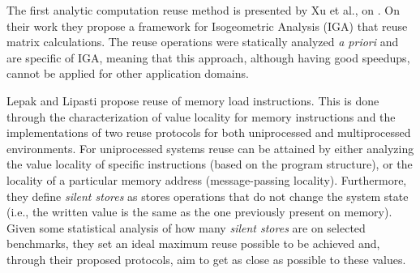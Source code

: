The first analytic computation reuse method is presented by Xu et al., on \cite{reuse12}. On their work they propose a framework for Isogeometric Analysis (IGA) that reuse matrix calculations. The reuse operations were statically analyzed \textit{a priori} and are specific of IGA, meaning that this approach, although having good speedups, cannot be applied for other application domains.

Lepak and Lipasti \cite{reuse14} propose reuse of memory load instructions. This is done through the characterization of value locality for memory instructions and the implementations of two reuse protocols for both uniprocessed and multiprocessed environments. For uniprocessed systems reuse can be attained by either analyzing the value locality of specific instructions (based on the program structure), or the locality of a particular memory address (message-passing locality). Furthermore, they define \textit{silent stores} as stores operations that do not change the system state (i.e., the written value is the same as the one previously present on memory). Given some statistical analysis of how many \textit{silent stores} are on selected benchmarks, they set an ideal maximum reuse possible to be achieved and, through their proposed protocols, aim to get as close as possible to these values.

